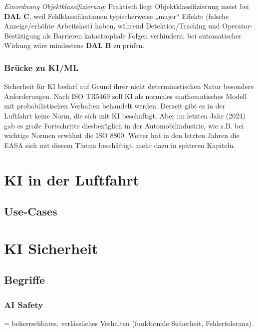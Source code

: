 \textit{Einordnung Objektklassifizierung:} Praktisch liegt Objektklassifizierung meist bei \textbf{DAL C}, weil Fehlklassifikationen typischerweise „major“ Effekte (falsche Anzeige/erhöhte Arbeitslast) haben, während Detektion/Tracking und Operator-Bestätigung als Barrieren katastrophale Folgen verhindern; bei automatischer Wirkung wäre mindestens \textbf{DAL B} zu prüfen.

\subsection{Brücke zu KI/ML}
Sicherheit für KI bedarf auf Grund ihrer nicht deterministischen Natur besondere Anforderungen.
Nach ISO TR5469 soll KI als normales mathematisches Modell mit probabilistischen Verhalten behandelt werden.
Derzeit gibt es in der Luftfahrt keine Norm, die sich mit KI beschäftigt. 
Aber im letzten Jahr (2024) gab es große Fortschritte diesbezüglich in der Automobilindustrie, wie z.B. bei wichtige Normen erwähnt die ISO 8800.
Weiter hat in den letzten Jahren die EASA sich mit diesem Thema beschäftigt, mehr dazu in späteren Kapiteln.









\chapter{KI in der Luftfahrt}
\section{Use-Cases} 











\chapter{KI Sicherheit}
\section{Begriffe} 

\subsection{AI Safety}
= beherrschbares, verlässliches Verhalten (funktionale Sicherheit, Fehlertoleranz).


